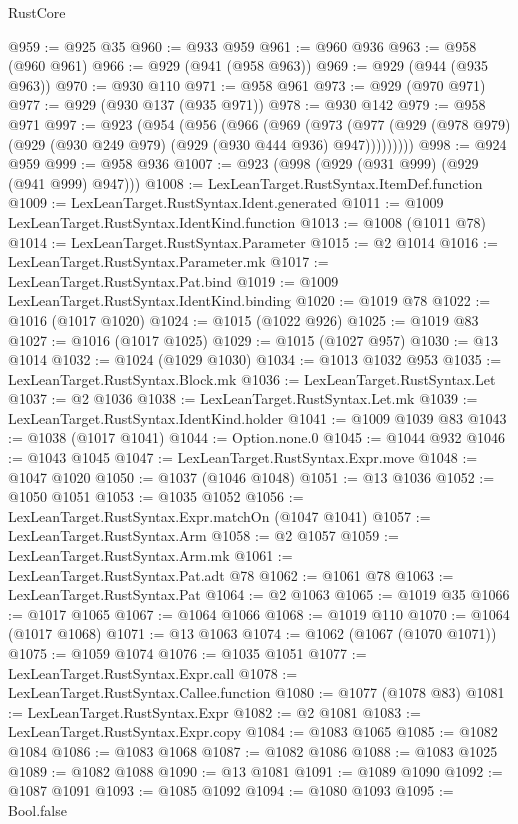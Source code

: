 \begin{lexlean}{RustCore}
\begin{coremodule}
@959 := @925 @35
@960 := @933 @959
@961 := @960 @936
@963 := @958 (@960 @961)
@966 := @929 (@941 (@958 @963))
@969 := @929 (@944 (@935 @963))
@970 := @930 @110
@971 := @958 @961
@973 := @929 (@970 @971)
@977 := @929 (@930 @137 (@935 @971))
@978 := @930 @142
@979 := @958 @971
@997 := @923
    (@954
      (@956
        (@966
          (@969
            (@973
              (@977 (@929 (@978 @979) (@929 (@930 @249 @979) (@929 (@930 @444 @936) @947)))))))))
@998 := @924 @959
@999 := @958 @936
@1007 := @923 (@998 (@929 (@931 @999) (@929 (@941 @999) @947)))
@1008 := LexLeanTarget.RustSyntax.ItemDef.function
@1009 := LexLeanTarget.RustSyntax.Ident.generated
@1011 := @1009 LexLeanTarget.RustSyntax.IdentKind.function
@1013 := @1008 (@1011 @78)
@1014 := LexLeanTarget.RustSyntax.Parameter
@1015 := @2 @1014
@1016 := LexLeanTarget.RustSyntax.Parameter.mk
@1017 := LexLeanTarget.RustSyntax.Pat.bind
@1019 := @1009 LexLeanTarget.RustSyntax.IdentKind.binding
@1020 := @1019 @78
@1022 := @1016 (@1017 @1020)
@1024 := @1015 (@1022 @926)
@1025 := @1019 @83
@1027 := @1016 (@1017 @1025)
@1029 := @1015 (@1027 @957)
@1030 := @13 @1014
@1032 := @1024 (@1029 @1030)
@1034 := @1013 @1032 @953
@1035 := LexLeanTarget.RustSyntax.Block.mk
@1036 := LexLeanTarget.RustSyntax.Let
@1037 := @2 @1036
@1038 := LexLeanTarget.RustSyntax.Let.mk
@1039 := LexLeanTarget.RustSyntax.IdentKind.holder
@1041 := @1009 @1039 @83
@1043 := @1038 (@1017 @1041)
@1044 := Option.none.{0}
@1045 := @1044 @932
@1046 := @1043 @1045
@1047 := LexLeanTarget.RustSyntax.Expr.move
@1048 := @1047 @1020
@1050 := @1037 (@1046 @1048)
@1051 := @13 @1036
@1052 := @1050 @1051
@1053 := @1035 @1052
@1056 := LexLeanTarget.RustSyntax.Expr.matchOn (@1047 @1041)
@1057 := LexLeanTarget.RustSyntax.Arm
@1058 := @2 @1057
@1059 := LexLeanTarget.RustSyntax.Arm.mk
@1061 := LexLeanTarget.RustSyntax.Pat.adt @78
@1062 := @1061 @78
@1063 := LexLeanTarget.RustSyntax.Pat
@1064 := @2 @1063
@1065 := @1019 @35
@1066 := @1017 @1065
@1067 := @1064 @1066
@1068 := @1019 @110
@1070 := @1064 (@1017 @1068)
@1071 := @13 @1063
@1074 := @1062 (@1067 (@1070 @1071))
@1075 := @1059 @1074
@1076 := @1035 @1051
@1077 := LexLeanTarget.RustSyntax.Expr.call
@1078 := LexLeanTarget.RustSyntax.Callee.function
@1080 := @1077 (@1078 @83)
@1081 := LexLeanTarget.RustSyntax.Expr
@1082 := @2 @1081
@1083 := LexLeanTarget.RustSyntax.Expr.copy
@1084 := @1083 @1065
@1085 := @1082 @1084
@1086 := @1083 @1068
@1087 := @1082 @1086
@1088 := @1083 @1025
@1089 := @1082 @1088
@1090 := @13 @1081
@1091 := @1089 @1090
@1092 := @1087 @1091
@1093 := @1085 @1092
@1094 := @1080 @1093
@1095 := Bool.false

\end{coremodule}
\end{lexlean}
